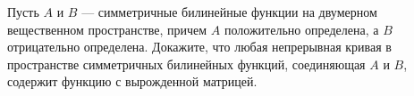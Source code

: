 \documentclass{article}
\begin{document}
Пусть $A$ и $B$ --- симметричные билинейные функции на двумерном вещественном пространстве, причем $A$ положительно определена,
а $B$ отрицательно определена. Докажите, что любая непрерывная кривая в пространстве симметричных билинейных функций, соединяющая $A$ и $B$, содержит функцию с вырожденной матрицей.
\end{document}
